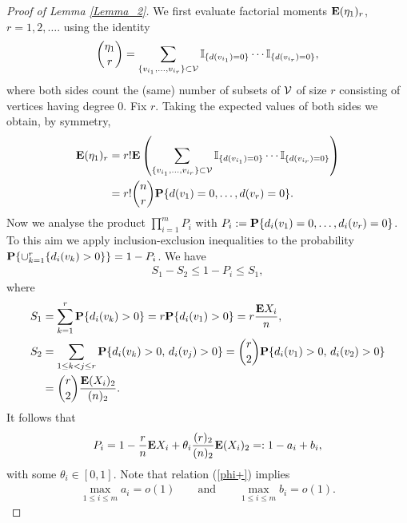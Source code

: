 \documentclass[11pt, a4paper]{article}
\newcommand{\E}{{\bf{E}}}
\newcommand{\PP}{{\bf{P}}}
\begin{document}
\begin{proof}[Proof of Lemma \ref{Lemma_2}]
We first evaluate factorial moments $\E(\eta_1)_r$, $r=1,2,\dots$.
using  the identity
\begin{displaymath}
\binom{\eta_1}{r}
=
\sum_{\{v_{i_1},\dots, v_{i_r}\}\subset {\cal V}}
{\mathbb I}_{\{d(v_{i_1})=0\}}\cdots{\mathbb I}_{\{d(v_{i_r})=0\}},
\end{displaymath}
where  both sides count the (same) number of subsets of 
${\cal V}$ of size $r$ consisting of vertices having degree $0$. 
Fix $r$. Taking the expected values of both sides we obtain, by symmetry,
\begin{align}
\nonumber
\E (\eta_1)_r
&
=r!\E\left( \sum_{\{v_{i_1},\dots, v_{i_r}\}\subset {\cal V}}{\mathbb I}_{\{d(v_{i_1})=0\}}\cdots{\mathbb I}_{\{d(v_{i_r})=0\}}\right)
\\
\label{2023-10-24+2}
&
=
r!\binom{n}{r}\PP\{d(v_1)=0,\dots, d(v_r)=0\}.
\end{align}
%
Now we analyse the product $\prod_{i=1}^mP_{i}$ with
$P_{i}:=\PP\{d_i(v_1)=0,\dots, d_i(v_r)=0\}$.
To this aim we apply inclusion-exclusion inequalities to the probability 
$\PP\{\cup_{k=1}^r\{d_i(v_k)>0\}\}=1-P_{i}$. We have
\begin{align*}   
S_1-S_2 \le 1-P_{i}\le  S_1,
\end{align*}
where
\begin{align*}
 S_1
 &
 =\sum_{k=1}^r\PP\{d_i(v_k)>0\}=r\PP\{d_i(v_1)>0\}
 =
r\frac{\E X_{i}}{n},
\\
S_2
&
=
\sum_{1\le k<j\le r}
\PP\{d_i(v_k)>0,\, d_i(v_j)>0\}
=
\binom{r}{2}
\PP\{d_i(v_1)>0,\, d_i(v_2)>0\}
\\
&
=
\binom{r}{2}
\frac{\E (X_{i})_2}{(n)_2}.
\end{align*}
It follows that
\begin{align*}
P_{i}=1-\frac{r}{n}\E X_{i}
+
\theta_i\frac{(r)_2}{(n)_2}\E (X_{i})_2
=:1-a_i+b_i,
\end{align*}
with some  $\theta_i\in[0,1]$.
Note that   relation
(\ref{phi+}) implies
\begin{align}
\label{2025-11-20+2}
\max_{1\le i\le m}a_i=o(1) 
\qquad
{\text{and}}
\qquad
 \max_{1\le i\le m}b_i=o(1).

\end{align}
\end{proof}
\end{document}
